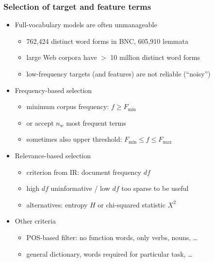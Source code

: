 \documentclass[t]{beamer} %
\begin{document}
\begin{frame}
  \frametitle{Selection of target and feature terms}
  
  \begin{itemize}
  \item Full-vocabulary models are often unmanageable
    \begin{itemize}
    \item 762,424 distinct word forms in BNC, 605,910 lemmata
    \item large Web corpora have $>$ 10 million distinct word forms
    \item low-frequency targets (and features) are not reliable (``noisy'')
    \end{itemize}
  \item<2-> Frequency-based selection
    \begin{itemize}
    \item minimum corpus frequency: $f \geq F_{\min}$
    \item or accept $n_w$ most frequent terms
    \item sometimes also upper threshold: $F_{\min}\leq f\leq F_{\max}$
    \end{itemize}
  \item<3-> Relevance-based selection
    \begin{itemize}
    \item criterion from IR: document frequency $df$
    \item high $df$ \so uninformative / low $df$ \so too sparse to be useful
    \item alternatives: entropy $H$ or chi-squared statistic $X^2$
    \end{itemize}
  \item<4-> Other criteria
    \begin{itemize}
    \item POS-based filter: no function words, only verbs, nouns, \ldots
    \item general dictionary, words required for particular task, \ldots
    \end{itemize}
  \end{itemize}
\end{frame}

\end{document}
